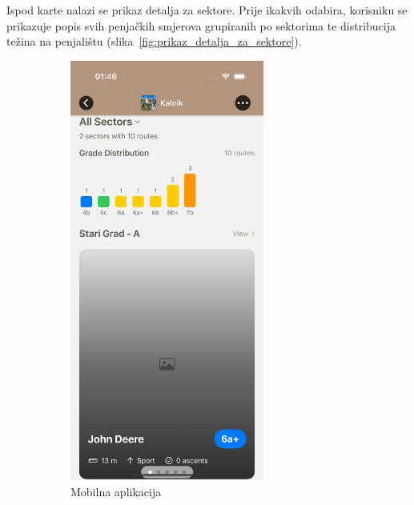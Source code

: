 Ispod karte nalazi se prikaz detalja za sektore. Prije ikakvih odabira, korisniku se prikazuje popis svih penjačkih smjerova grupiranih po sektorima te distribucija težina na penjalištu (slika~\ref{fig:prikaz_detalja_za_sektore}). 

\begin{figure}[H]
    \centering
    \begin{subfigure}[b]{0.4\textwidth}
        \centering
        \includegraphics[width=0.7\textwidth]{images/implementacija/crag-details/crag-all-sectors-tabs.png}
        \caption{Mobilna aplikacija}
        \label{fig:prikaz_detalja_za_sektore_mob}
    \end{subfigure}
    \hfill
    \begin{subfigure}[b]{0.55\textwidth}

\end{subfigure}
\end{figure}
